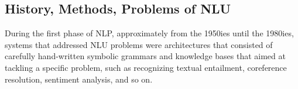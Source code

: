 \subsection{History, Methods, Problems of NLU}






During the first phase of NLP, approximately from the 1950ies until the 1980ies, systems
that addressed NLU problems were architectures that consisted of carefully hand-written
symbolic grammars and knowledge bases that aimed at tackling a specific problem, such as
recognizing textual entailment, coreference resolution, sentiment analysis, and so on.

